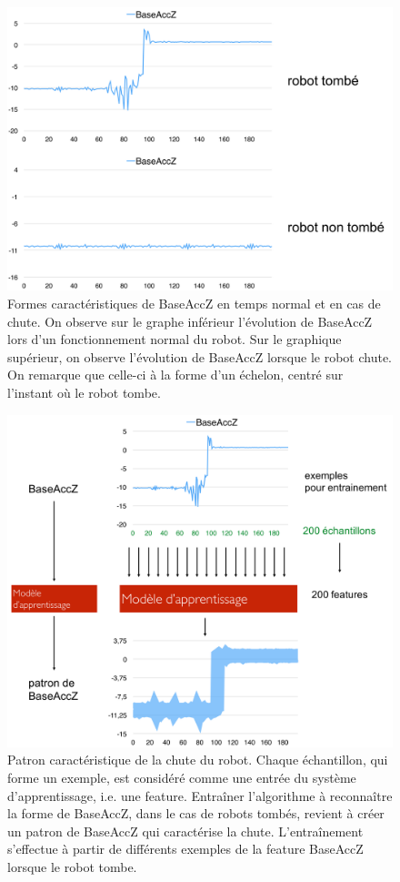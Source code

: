 \begin{figure}[h]
	\centering\includegraphics[width=13cm]{images/fall_not_fall.png}
	\caption[Formes caractéristiques de BaseAccZ en temps normal et en cas de chute]{Formes caractéristiques de BaseAccZ en temps normal et en cas de chute. On observe sur le graphe inférieur l'évolution de BaseAccZ lors d'un fonctionnement normal du robot. Sur le graphique supérieur, on observe l'évolution de BaseAccZ lorsque le robot chute. On remarque que celle-ci à la forme d'un échelon, centré sur l'instant où le robot tombe.}
	\label{fig:Formes caractéristiques de BaseAccZ en temps normal et en cas de chute}
\end{figure}

\begin{figure}[h]
	\centering\includegraphics[width=12cm]{images/patron.png}
	\caption[Patron caractéristique de la chute du robot]{Patron caractéristique de la chute du robot. Chaque échantillon, qui forme un exemple, est considéré comme une entrée du système d'apprentissage, i.e. une feature. Entraîner l'algorithme à reconnaître la forme de BaseAccZ, dans le cas de robots tombés, revient à créer un patron de BaseAccZ qui caractérise la chute. L'entraînement s'effectue à partir de différents exemples de la feature BaseAccZ lorsque le robot tombe.}
	\label{fig:Créer un patron caractéristique de la chute du robot}
\end{figure}

